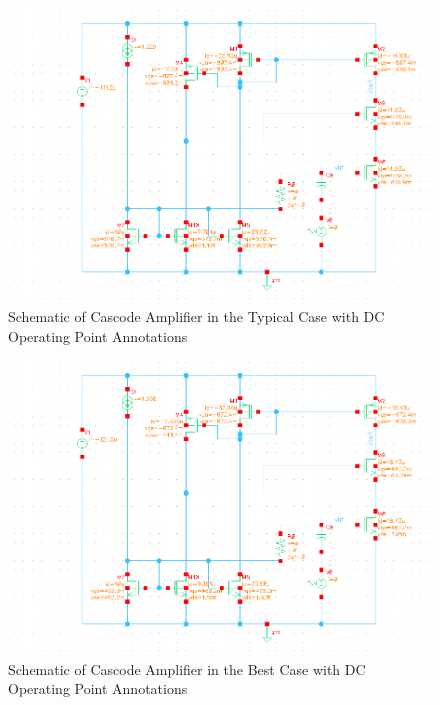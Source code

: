 \documentclass{article}
\begin{document}
\begin{figure}[H]
\centering
\includegraphics[width=6in]{2_cas_dcop.png}
\caption{Schematic of Cascode Amplifier in the Typical Case with DC Operating Point Annotations}
\label{cas_dcop}
\end{figure}

\begin{figure}[H]
\centering
\includegraphics[width=6in]{2_cas_dcop_ff.png}
\caption{Schematic of Cascode Amplifier in the Best Case with DC Operating Point Annotations}
\label{cas_dcop_ff}
\end{figure}
\end{document}
